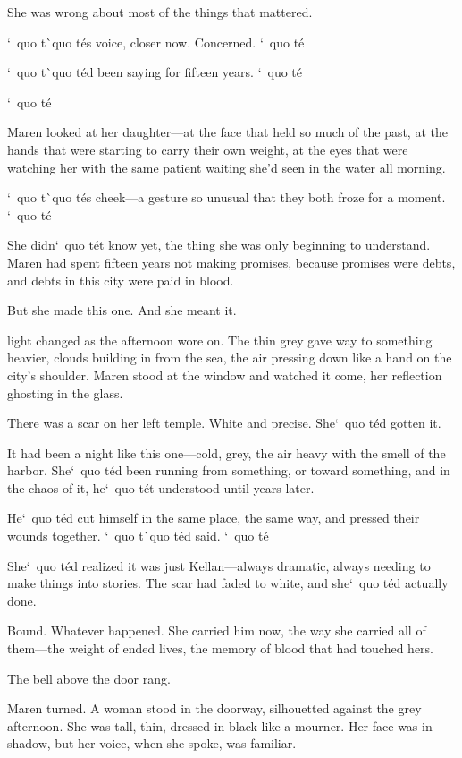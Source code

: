 \documentclass[12pt,letterpaper,openany]{book}
\begin{document}
\par
She was wrong about most of the things that mattered.
\par
`\ quo t\`\ quo t\'e{}s voice, closer now. Concerned. `\ quo t\'e{}
\par
`\ quo t\`\ quo t\'e{}d been saying for fifteen years. `\ quo t\'e{}
\par
`\ quo t\'e{}
\par
Maren looked at her daughter—at the face that held so much of the past, at the hands that were starting to carry their own weight, at the eyes that were watching her with the same patient waiting she'd seen in the water all morning.
\par
`\ quo t\`\ quo t\'e{}s cheek—a gesture so unusual that they both froze for a moment. `\ quo t\'e{}
\par
She didn`\ quo t\'e{}t know yet, the thing she was only beginning to understand. Maren had spent fifteen years not making promises, because promises were debts, and debts in this city were paid in blood.
\par
But she made this one. And she meant it.
\par
\hrulefillThe light changed as the afternoon wore on. The thin grey gave way to something heavier, clouds building in from the sea, the air pressing down like a hand on the city's shoulder. Maren stood at the window and watched it come, her reflection ghosting in the glass.
\par
There was a scar on her left temple. White and precise. She`\ quo t\'e{}d gotten it.
\par
It had been a night like this one—cold, grey, the air heavy with the smell of the harbor. She`\ quo t\'e{}d been running from something, or toward something, and in the chaos of it, he`\ quo t\'e{}t understood until years later.
\par
He`\ quo t\'e{}d cut himself in the same place, the same way, and pressed their wounds together. `\ quo t\`\ quo t\'e{}d said. `\ quo t\'e{}
\par
She`\ quo t\'e{}d realized it was just Kellan—always dramatic, always needing to make things into stories. The scar had faded to white, and she`\ quo t\'e{}d actually done.
\par
Bound. Whatever happened. She carried him now, the way she carried all of them—the weight of ended lives, the memory of blood that had touched hers.
\par
The bell above the door rang.
\par
Maren turned. A woman stood in the doorway, silhouetted against the grey afternoon. She was tall, thin, dressed in black like a mourner. Her face was in shadow, but her voice, when she spoke, was familiar.
\end{document}
